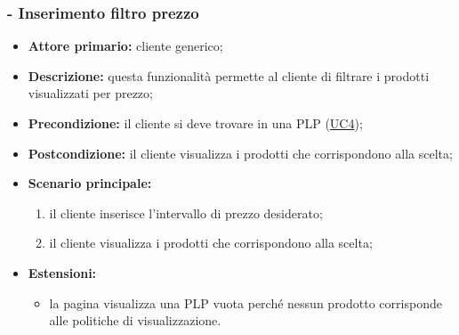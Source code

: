 \subsubsection{ - Inserimento filtro prezzo}
\begin{itemize}
    \item \textbf{Attore primario:} cliente generico;
    \item \textbf{Descrizione:} questa funzionalità permette al cliente di filtrare i prodotti visualizzati per prezzo;
    \item \textbf{Precondizione:} il cliente si deve trovare in una PLP (\hyperref[UC4]{UC4});
    \item \textbf{Postcondizione:} il cliente visualizza i prodotti che corrispondono alla scelta;
    \item \textbf{Scenario principale:}
          \begin{enumerate}
              \item il cliente inserisce l'intervallo di prezzo desiderato;
              \item il cliente visualizza i prodotti che corrispondono alla scelta;
          \end{enumerate}
    \item \textbf{Estensioni:}
          \begin{itemize}
              \item la pagina visualizza una PLP vuota perché nessun prodotto corrisponde alle politiche di visualizzazione.
          \end{itemize}
\end{itemize}

\stepsubUserCase

